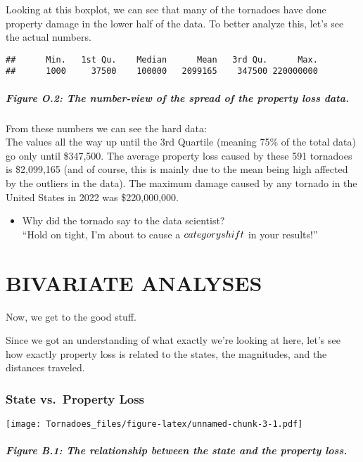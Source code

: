 \documentclass[
]{article}
\providecommand{\tightlist}{%
  \setlength{\itemsep}{0pt}\setlength{\parskip}{0pt}}
\begin{document}
Looking at this boxplot, we can see that many of the tornadoes have done
property damage in the lower half of the data. To better analyze this,
let's see the actual numbers.

\begin{verbatim}
##      Min.   1st Qu.    Median      Mean   3rd Qu.      Max. 
##      1000     37500    100000   2099165    347500 220000000
\end{verbatim}

\subparagraph{Figure O.2: The number-view of the spread of the property
loss
data.}\label{figure-o.2-the-number-view-of-the-spread-of-the-property-loss-data.}

From these numbers we can see the hard data:\\
The values all the way up until the 3rd Quartile (meaning 75\% of the
total data) go only until \$347,500. The average property loss caused by
these 591 tornadoes is \$2,099,165 (and of course, this is mainly due to
the mean being high affected by the outliers in the data). The maximum
damage caused by any tornado in the United States in 2022 was
\$220,000,000.

\begin{itemize}
\tightlist
\item
  Why did the tornado say to the data scientist?\\
  ``Hold on tight, I'm about to cause a \(category \space shift\) in
  your results!''
\end{itemize}

\section{BIVARIATE ANALYSES}\label{bivariate-analyses}

Now, we get to the good stuff.

Since we got an understanding of what exactly we're looking at here,
let's see how exactly property loss is related to the states, the
magnitudes, and the distances traveled.

\subsubsection{State vs.~Property Loss}\label{state-vs.-property-loss}

\texttt{[image: Tornadoes\_files/figure-latex/unnamed-chunk-3-1.pdf]}

\subparagraph{Figure B.1: The relationship between the state and the
property
loss.}\label{figure-b.1-the-relationship-between-the-state-and-the-property-loss.}
\end{document}
